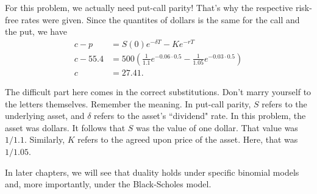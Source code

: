 \documentclass{ximera}
\begin{document}
\begin{solution}
For this problem, we actually need put-call parity! That's why the respective risk-free rates were given. Since the quantites of dollars is the same for the call and the put, we have
	\begin{align*}
	c-p&=S(0)e^{-\delta T}-Ke^{-rT}\\
	c-55.4&=500\left(\frac{1}{1.1}e^{-0.06\cdot 0.5}-\frac{1}{1.05}e^{-0.03\cdot 0.5}\right)\\
	c&=27.41.
	\end{align*}
\end{solution}

The difficult part here comes in the correct substitutions. Don't marry yourself to the letters themselves. Remember the meaning. In put-call parity, $S$ refers to the underlying asset, and $\delta$ refers to the asset's ``dividend" rate. In this problem, the asset was dollars. It follows that $S$ was the value of one dollar. That value was $1/1.1$. Similarly, $K$ refers to the agreed upon price of the asset. Here, that was $1/1.05$.

In later chapters, we will see that duality holds under specific binomial models and, more importantly, under the Black-Scholes model.
\end{document}
